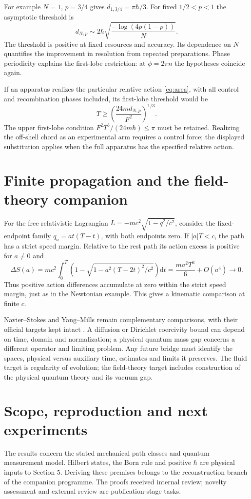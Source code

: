 \documentclass[11pt,a4paper]{article}
\newcommand{\dd}{\mathrm{d}}
\begin{document}
For example $N=1$, $p=3/4$ gives $d_{1,3/4}=\pi\hbar/3$. For fixed
$1/2<p<1$ the asymptotic threshold is
\[
 d_{N,p}\sim2\hbar\sqrt{\frac{-\log(4p(1-p))}{N}}.
\]
The threshold is positive at fixed resources and accuracy. Its dependence on $N$
quantifies the improvement in resolution from repeated preparations. Phase
periodicity explains the first-lobe restriction: at $\phi=2\pi n$ the hypotheses
coincide again.

If an apparatus realizes the particular relative action \eqref{eq:area}, with
all control and recombination phases included, its first-lobe threshold would be
\[
 T\ge \left(\frac{24m d_{N,p}}{F^2}\right)^{1/3}.
\]
The upper first-lobe condition $F^2T^3/(24m\hbar)\le\pi$ must be retained.
Realizing the off-shell chord as an experimental arm requires a control force;
the displayed substitution applies when the full apparatus has the specified
relative action.

\section{Finite propagation and the field-theory companion}
For the free relativistic Lagrangian $L=-mc^2\sqrt{1-\dot q^2/c^2}$, consider
the fixed-endpoint family $q_a=a t(T-t)$, with both endpoints zero.
If $|a|T<c$, the path has a strict speed margin. Relative to
the rest path its action excess is positive for $a\ne0$ and
\[
 \Delta S(a)=mc^2\int_0^T
 \left(1-\sqrt{1-a^2(T-2t)^2/c^2}\right)\dd t
 =\frac{ma^2T^3}{6}+O(a^4)\longrightarrow0.
\]
Thus positive action differences accumulate at zero within the strict speed
margin, just as in the Newtonian example. This gives a kinematic comparison
at finite $c$.

Navier--Stokes and Yang--Mills remain complementary comparisons, with their
official targets kept intact \cite{Fefferman,JaffeWitten}. A diffusion or
Dirichlet coercivity bound can depend on time, domain and normalization; a physical
quantum mass gap concerns a different operator and limiting problem. Any future
bridge must identify the spaces, physical versus auxiliary time, estimates and
limits it preserves. The fluid target is regularity of evolution; the field-theory
target includes construction of the physical quantum theory and its vacuum gap.

\section{Scope, reproduction and next experiments}
The results concern the stated mechanical path classes and quantum measurement
model. Hilbert states, the Born rule and positive $\hbar$ are physical inputs to
Section 5. Deriving these premises belongs to the reconstruction branch of the
companion programme. The proofs received internal review; novelty assessment and
external review are publication-stage tasks.
\end{document}
